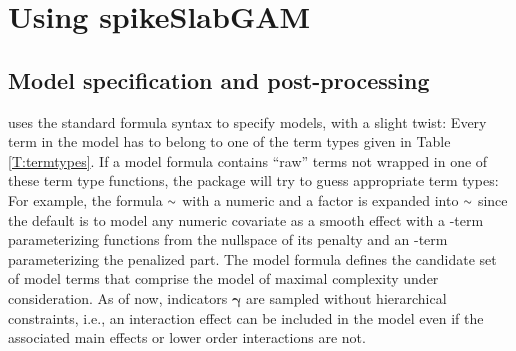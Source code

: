 \documentclass[article, shortnames, nojss, noheadings, notitle]{jss}
\newcommand{\ftilde}{\raise.17ex\hbox{$\scriptstyle\mathtt{\sim}$}}
\begin{document}
\section{Using spikeSlabGAM}\label{using}

\subsection{Model specification and post-processing}\label{specification}
 uses the standard  formula syntax to specify models, with a slight twist:
Every term in the model has to belong to one of the term types given
in Table \ref{T:termtypes}. If a model formula contains ``raw'' terms not wrapped in one of
these term type functions, the package will try to guess appropriate term types: For example, the formula $\ftilde$ with a numeric  and a factor  is expanded
into $\ftilde$ since the default is to model any numeric covariate
as a smooth effect with a -term parameterizing functions from the nullspace of its penalty
and an -term parameterizing the penalized part.
The model formula defines the candidate set of model terms that comprise the
model of maximal complexity under consideration. As of now, indicators $\bm\gamma$ are sampled without hierarchical constraints,
i.e., an interaction effect can be included in the model even if the associated main effects or lower order interactions are not.
\end{document}
